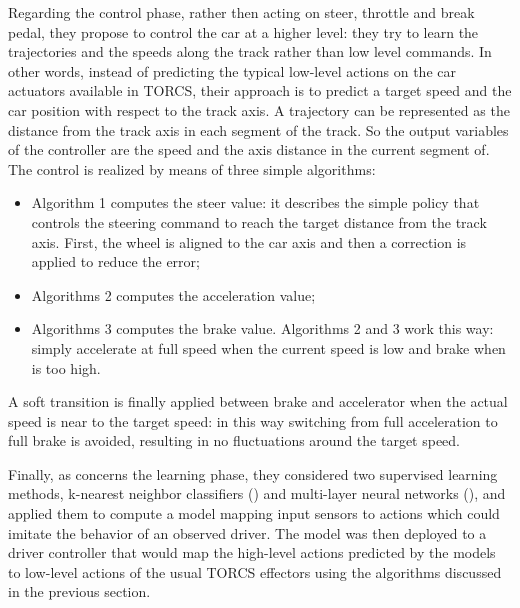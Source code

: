 Regarding the control phase, rather then acting on steer, throttle and break pedal, they propose  to control the car at a higher
level: they try to learn the trajectories and the speeds along
the track rather than low level commands.
In other words, instead of predicting the typical low-level actions on the car actuators available in TORCS, their approach is to predict a target speed and the car position with respect to the track axis.
A trajectory can be represented as the distance from the track axis in each segment of the track. So the output variables of the controller are the speed and the axis distance in the current segment of.
The control is realized by means of three simple algorithms:
\begin{itemize}
\item Algorithm 1 computes the steer value: it describes the simple policy that controls the steering command to reach the target distance from the track axis. First, the wheel is aligned to the car axis and then a correction is applied to reduce the error;
\item Algorithms 2 computes the acceleration value;
\item Algorithms 3 computes the brake value. 
Algorithms 2 and 3 work this way: simply accelerate at full speed when the current speed is low and brake when is too high. 
\end{itemize}
A soft transition is finally applied between brake and accelerator when the actual speed is near to the target speed: in this way switching from full acceleration to full brake is avoided, resulting in no fluctuations around the target speed.

 
Finally, as concerns the learning phase, they considered two supervised learning methods, k-nearest neighbor classifiers (\cite{knn}) and multi-layer neural networks (\cite{neat}), and applied them to compute a model mapping input sensors to actions which could imitate the behavior of an observed driver.
The model was then deployed to a driver controller that would map the high-level actions predicted by the models to low-level actions of the usual TORCS effectors
using the algorithms discussed in the previous section.

